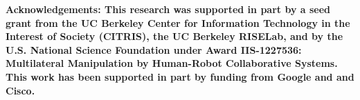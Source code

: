 \documentclass[sigconf]{acmart}
\begin{document}
\maketitle










%
%
%
%
%
%
%
% 

% 

%
%
%
%
%
%
%
%
%


%

\vspace{1.5em}
\noindent \textbf{Acknowledgements: 
This research was supported in part by a seed grant from the UC Berkeley Center for Information Technology in the Interest of Society (CITRIS), the UC Berkeley RISELab, and by the U.S. National Science Foundation under Award IIS-1227536: Multilateral Manipulation by Human-Robot Collaborative Systems. This work has been supported in part by funding from Google and and Cisco.}



 
\normalsize \selectfont
%
\end{document}
